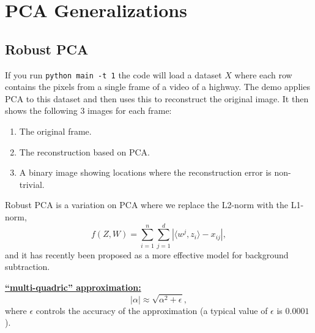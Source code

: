 \documentclass{article}
\def\enum#1{\begin{enumerate}#1\end{enumerate}}
\begin{document}
\title{}
\date{}
\maketitle

\vspace{-7em}



\section{PCA Generalizations}

\subsection{Robust PCA}


If you run \verb|python main -t 1| the code will load a dataset $X$ where each row contains the pixels from a single frame of a video of a highway. The demo applies PCA to this dataset and then uses this to reconstruct the original image.
It then shows the following 3 images for each frame:
\enum{
\item The original frame.
\item The reconstruction based on PCA.
\item A binary image showing locations where the reconstruction error is non-trivial.
}


Robust PCA is a variation on PCA where we replace the L2-norm with the L1-norm,
\[
f(Z,W) = \sum_{i=1}^n\sum_{j=1}^d |\langle w^j, z_i\rangle - x_{ij}|,
\]
and it has recently been proposed as a more effective model for background subtraction. 


\underline{\textbf{``multi-quadric'' approximation:}}
\[
|\alpha| \approx \sqrt{\alpha^2 + \epsilon},
\]
where $\epsilon$ controls the accuracy of the approximation (a typical value of $\epsilon$ is $0.0001$).
\end{document}
